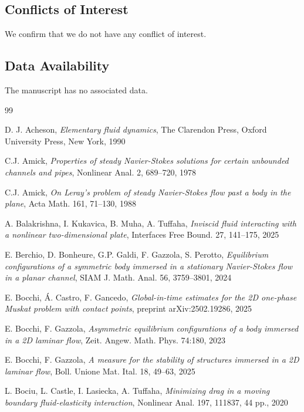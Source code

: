 \documentclass[11pt,a4paper]{amsart}
\theoremstyle{remark}
\theoremstyle{definition}
\numberwithin{equation}{section}
\numberwithin{proposition}{section}
\begin{document}
\subsection*{Conflicts of Interest} We confirm that we do not have any conflict of interest.

\subsection*{Data Availability} The manuscript has no associated data.

{\small

\begin{thebibliography}{99}

D. J. Acheson, \textit{Elementary fluid dynamics}, The Clarendon Press, Oxford University Press, New York, 1990

 C.J. Amick, {\em Properties of steady Navier-Stokes solutions for certain unbounded channels and pipes}, Nonlinear Anal. 2, 689--720, 1978

 C.J. Amick, {\em On Leray's problem of steady Navier-Stokes flow past a body in the plane}, Acta Math. 161, 71--130, 1988

 A. Balakrishna, I. Kukavica, B. Muha, A. Tuffaha, {\em
Inviscid fluid interacting with a nonlinear two-dimensional plate},
Interfaces Free Bound. 27, 141–175, 2025

 E. Berchio, D. Bonheure, G.P. Galdi, F. Gazzola, S. Perotto, {\em Equilibrium configurations of a symmetric body immersed in a stationary Navier-Stokes flow in a planar channel}, SIAM J. Math. Anal. 56, 3759--3801, 2024


 E. Bocchi, Á. Castro, F. Gancedo, {\em Global-in-time estimates for the 2D one-phase Muskat problem with contact points}, preprint arXiv:2502.19286, 2025

 E. Bocchi, F. Gazzola, {\em Asymmetric equilibrium configurations of a body immersed in a 2D laminar flow}, Zeit. Angew. Math. Phys. 74:180, 2023

 E. Bocchi, F. Gazzola, {\em A measure for the stability of structures immersed in a 2D laminar flow}, Boll. Unione Mat. Ital. 18, 49--63, 2025

    L. Bociu,  L. Castle, I. Lasiecka,  A. Tuffaha,
      {\em Minimizing drag in a moving boundary fluid-elasticity interaction}, Nonlinear Anal. 197, 111837, 44 pp., 2020



\end{thebibliography}}
\end{document}
